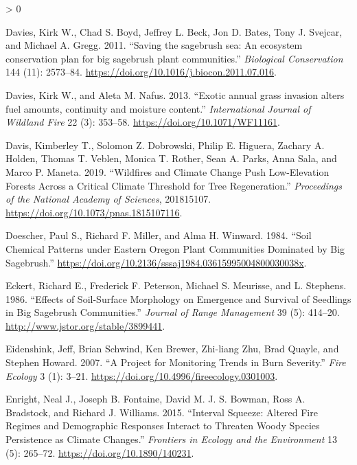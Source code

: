 \documentclass[
  12pt,
]{article}
\newlength{\cslhangindent}
\newenvironment{CSLReferences}[2] %
 {%
  \setlength{\parindent}{0pt}
  \ifodd #1 \everypar{\setlength{\hangindent}{\cslhangindent}}\ignorespaces\fi
  \ifnum #2 > 0
  \setlength{\parskip}{#2\baselineskip}
  \fi
 }%
 {}
\begin{document}
\begin{CSLReferences}{1}{0}
\leavevmode\hypertarget{ref-Davies2011}{}%
Davies, Kirk W., Chad S. Boyd, Jeffrey L. Beck, Jon D. Bates, Tony J.
Svejcar, and Michael A. Gregg. 2011. {``{Saving the sagebrush sea: An
ecosystem conservation plan for big sagebrush plant communities}.''}
\emph{Biological Conservation} 144 (11): 2573--84.
\url{https://doi.org/10.1016/j.biocon.2011.07.016}.

\leavevmode\hypertarget{ref-Davies2013}{}%
Davies, Kirk W., and Aleta M. Nafus. 2013. {``{Exotic annual grass
invasion alters fuel amounts, continuity and moisture content}.''}
\emph{International Journal of Wildland Fire} 22 (3): 353--58.
\url{https://doi.org/10.1071/WF11161}.

\leavevmode\hypertarget{ref-Davis2019}{}%
Davis, Kimberley T., Solomon Z. Dobrowski, Philip E. Higuera, Zachary A.
Holden, Thomas T. Veblen, Monica T. Rother, Sean A. Parks, Anna Sala,
and Marco P. Maneta. 2019. {``Wildfires and Climate Change Push
Low-Elevation Forests Across a Critical Climate Threshold for Tree
Regeneration.''} \emph{Proceedings of the National Academy of Sciences},
201815107. \url{https://doi.org/10.1073/pnas.1815107116}.

\leavevmode\hypertarget{ref-Doescher1984}{}%
Doescher, Paul S., Richard F. Miller, and Alma H. Winward. 1984.
{``{Soil Chemical Patterns under Eastern Oregon Plant Communities
Dominated by Big Sagebrush}.''}
\url{https://doi.org/10.2136/sssaj1984.03615995004800030038x}.

\leavevmode\hypertarget{ref-Eckert1986}{}%
Eckert, Richard E., Frederick F. Peterson, Michael S. Meurisse, and L.
Stephens. 1986. {``{Effects of Soil-Surface Morphology on Emergence and
Survival of Seedlings in Big Sagebrush Communities}.''} \emph{Journal of
Range Management} 39 (5): 414--20.
\url{http://www.jstor.org/stable/3899441}.

\leavevmode\hypertarget{ref-Eidenshink2007}{}%
Eidenshink, Jeff, Brian Schwind, Ken Brewer, Zhi-liang Zhu, Brad Quayle,
and Stephen Howard. 2007. {``{A Project for Monitoring Trends in Burn
Severity}.''} \emph{Fire Ecology} 3 (1): 3--21.
\url{https://doi.org/10.4996/fireecology.0301003}.

\leavevmode\hypertarget{ref-Enright2015}{}%
Enright, Neal J., Joseph B. Fontaine, David M. J. S. Bowman, Ross A.
Bradstock, and Richard J. Williams. 2015. {``Interval Squeeze: Altered
Fire Regimes and Demographic Responses Interact to Threaten Woody
Species Persistence as Climate Changes.''} \emph{Frontiers in Ecology
and the Environment} 13 (5): 265--72.
\url{https://doi.org/10.1890/140231}.


\end{CSLReferences}
\end{document}
